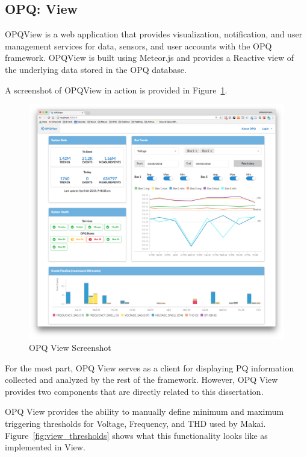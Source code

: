 \subsection{OPQ: View}\label{subsec:opq:-view}
OPQView is a web application that provides visualization, notification, and user management services for data, sensors, and user accounts with the OPQ framework. OPQView is built using Meteor.js and provides a Reactive view of the underlying data stored in the OPQ database.

A screenshot of OPQView in action is provided in Figure~\ref{fig:opq-view}.

\begin{figure}
	\centering
	\includegraphics[width=1\linewidth]{figures/opqview-landing-page.png}
	\caption{OPQ View Screenshot}\label{fig:opq-view}
\end{figure}

For the most part, OPQ View serves as a client for displaying PQ information collected and analyzed by the rest of the framework. However, OPQ View provides two components that are directly related to this dissertation.

OPQ View provides the ability to manually define minimum and maximum triggering thresholds for Voltage, Frequency, and THD used by Makai. Figure~\ref{fig:view_thresholds} shows what this functionality looks like as implemented in View.

